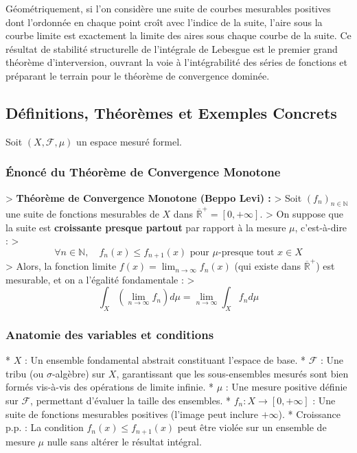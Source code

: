 \documentclass[11pt,a4paper]{article}
\begin{document}
Géométriquement, si l'on considère une suite de courbes mesurables positives dont l'ordonnée en chaque point croît avec l'indice de la suite, l'aire sous la courbe limite est exactement la limite des aires sous chaque courbe de la suite. Ce résultat de stabilité structurelle de l'intégrale de Lebesgue est le premier grand théorème d'interversion, ouvrant la voie à l'intégrabilité des séries de fonctions et préparant le terrain pour le théorème de convergence dominée.

\subsection*{Définitions, Théorèmes et Exemples Concrets}

Soit $(X, \mathcal{F}, \mu)$ un espace mesuré formel.

\subsubsection*{Énoncé du Théorème de Convergence Monotone}

> \textbf{Théorème de Convergence Monotone (Beppo Levi) :}
> Soit $(f_n)_{n \in \mathbb{N}}$ une suite de fonctions mesurables de $X$ dans $\overline{\mathbb{R}}^+ = [0, +\infty]$.
> On suppose que la suite est \textbf{croissante presque partout} par rapport à la mesure $\mu$, c'est-à-dire :
> $$\forall n \in \mathbb{N}, \quad f_n(x) \le f_{n+1}(x) \text{ pour } \mu\text{-presque tout } x \in X$$
> Alors, la fonction limite $f(x) = \lim_{n \to \infty} f_n(x)$ (qui existe dans $\overline{\mathbb{R}}^+$) est mesurable, et on a l'égalité fondamentale :
> $$\int_X \left( \lim_{n \to \infty} f_n \right) d\mu = \lim_{n \to \infty} \int_X f_n d\mu$$

\subsubsection*{Anatomie des variables et conditions}
*   $X$ : Un ensemble fondamental abstrait constituant l'espace de base.
*   $\mathcal{F}$ : Une tribu (ou $\sigma$-algèbre) sur $X$, garantissant que les sous-ensembles mesurés sont bien formés vis-à-vis des opérations de limite infinie.
*   $\mu$ : Une mesure positive définie sur $\mathcal{F}$, permettant d'évaluer la taille des ensembles.
*   $f_n : X \to [0, +\infty]$ : Une suite de fonctions mesurables positives (l'image peut inclure $+\infty$).
*   Croissance p.p. : La condition $f_n(x) \le f_{n+1}(x)$ peut être violée sur un ensemble de mesure $\mu$ nulle sans altérer le résultat intégral.
\end{document}
